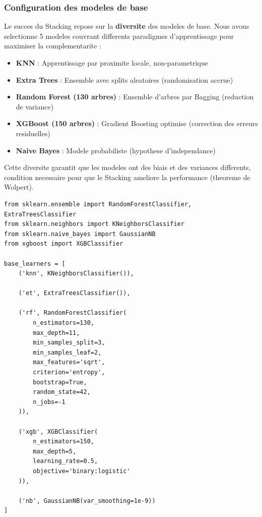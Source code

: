 \subsubsection{Configuration des modeles de base}

Le succes du Stacking repose sur la \textbf{diversite} des modeles de base. Nous avons selectionne 5 modeles couvrant differents paradigmes d'apprentissage pour maximiser la complementarite :

\begin{itemize}
    \item \textbf{KNN} : Apprentissage par proximite locale, non-parametrique
    \item \textbf{Extra Trees} : Ensemble avec splits aleatoires (randomisation accrue)
    \item \textbf{Random Forest (130 arbres)} : Ensemble d'arbres par Bagging (reduction de variance)
    \item \textbf{XGBoost (150 arbres)} : Gradient Boosting optimise (correction des erreurs residuelles)
    \item \textbf{Naive Bayes} : Modele probabiliste (hypothese d'independance)
\end{itemize}

Cette diversite garantit que les modeles ont des biais et des variances differents, condition necessaire pour que le Stacking ameliore la performance (theoreme de Wolpert).

\begin{lstlisting}[style=reportPython, caption={Configuration des modeles de base avec principe de complementarite}]
from sklearn.ensemble import RandomForestClassifier, ExtraTreesClassifier
from sklearn.neighbors import KNeighborsClassifier
from sklearn.naive_bayes import GaussianNB
from xgboost import XGBClassifier

base_learners = [
    ('knn', KNeighborsClassifier()),
    
    ('et', ExtraTreesClassifier()),
    
    ('rf', RandomForestClassifier(
        n_estimators=130,
        max_depth=11,
        min_samples_split=3,
        min_samples_leaf=2,
        max_features='sqrt',
        criterion='entropy',
        bootstrap=True,
        random_state=42,
        n_jobs=-1
    )),
    
    ('xgb', XGBClassifier(
        n_estimators=150,
        max_depth=5,
        learning_rate=0.5,
        objective='binary:logistic'
    )),
    
    ('nb', GaussianNB(var_smoothing=1e-9))
]
\end{lstlisting}

